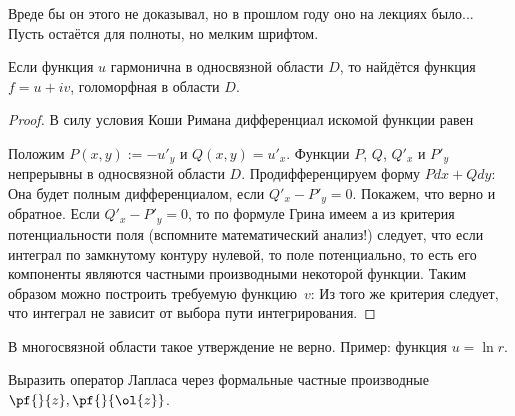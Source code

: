 \documentclass[a4paper]{article}
\begin{document}
\begin{petit}
Вреде бы он этого не доказывал, но в прошлом году оно на лекциях было... Пусть остаётся для полноты, но мелким шрифтом.

\medskip

\begin{stm}
Если функция $u$ гармонична в односвязной области $D$, то найдётся функция $f = u + iv$, голоморфная в области $D$.
\end{stm}
\begin{proof}
В силу условия Коши Римана дифференциал искомой функции равен

Положим $P(x,y):= -u'_y$ и $Q(x,y)=u'_x$. Функции $P$, $Q$, $Q'_x$ и $P'_y$ непрерывны в
односвязной области $D$. Продифференцируем форму $Pdx + Qdy$:
Она будет полным дифференциалом, если $Q'_x - P'_y = 0$. Покажем, что верно и обратное.
Если $Q'_x - P'_y = 0$, то по формуле Грина имеем
а из критерия потенциальности поля (вспомните математический анализ!) следует, что
если интеграл по замкнутому контуру нулевой, то поле потенциально, то есть его компоненты
являются частными производными некоторой функции. Таким образом можно построить требуемую функцию~$v$:
Из того же критерия следует, что интеграл не зависит от выбора пути интегрирования.
\end{proof}

\begin{note}
В многосвязной области такое утверждение не верно. Пример: функция $u = \ln r$.
\end{note}
\end{petit}

\begin{problem}
Выразить оператор Лапласа через формальные частные производные $\pf{}{z},\pf{}{\ol{z}}$.
\end{problem}
\end{document}
